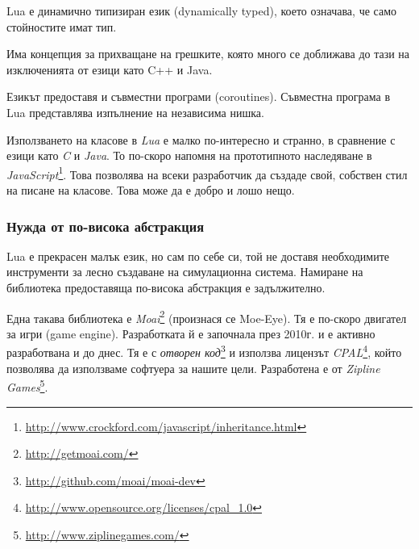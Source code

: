 				Lua е динамично типизиран език (dynamically typed), което означава, че само стойностите имат тип.
				
								
				
				
				Има концепция за прихващане на грешките, която много се доближава до тази на изключенията от езици като
				C++ и Java.
				
				
				
				
				\newpage
				
				Езикът предоставя и съвместни програми (coroutines). Съвместна програма в Lua представлява изпълнение на независима нишка.
				
				
				
				
				
				\newpage
				
				Използването на класове в \emph{Lua} е малко по-интересно и странно, в сравнение с езици като \emph{C} и \emph{Java}. 
				То по-скоро напомня на прототипното наследяване в
				\emph{JavaScript}\footnote{\url{http://www.crockford.com/javascript/inheritance.html}}.
				Това позволява на всеки разработчик да създаде свой, собствен стил на писане на класове. Това може да е добро и лошо нещо.
				
				
				
								
		
		\subsubsection{Нужда от по-висока абстракция}
		
			Lua е прекрасен малък език, но сам по себе си, той не доставя необходимите инструменти
			за лесно създаване на симулационна система. Намиране на библиотека предоставяща по-висока
			абстракция е задължително.
			
			Една такава библиотека е \emph{Moai}\footnote{\url{http://getmoai.com/}} (произнася се Moe-Eye).
			Тя е по-скоро двигател за игри (game engine).
			Разработката й е започнала през 2010г. и е активно разработвана и до днес. 
			Тя е с \emph{отворен код}\footnote{\url{http://github.com/moai/moai-dev}}
			и използва лицензът \emph{CPAL}\footnote{\url{http://www.opensource.org/licenses/cpal_1.0}}, който
			позволява да използваме софтуера за нашите цели. 
			Разработена е от \emph{Zipline Games}\footnote{\url{http://www.ziplinegames.com/}}.						
			
